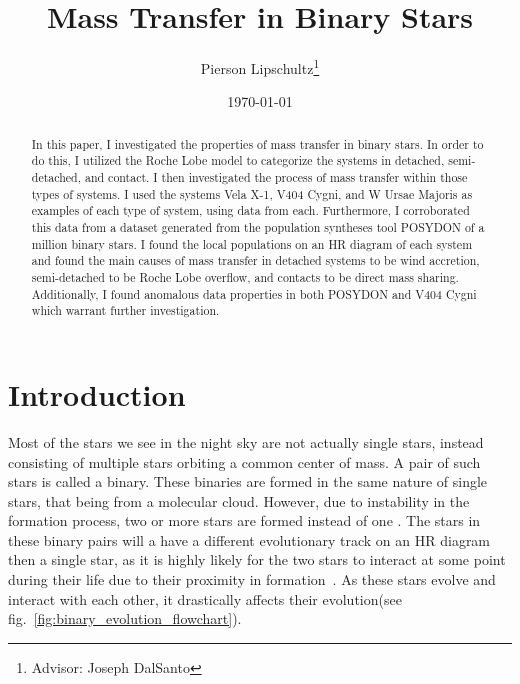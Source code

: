 \documentclass[12pt, a4paper]{article}
\title{Mass Transfer in Binary Stars}
\author{Pierson Lipschultz\thanks{Advisor: Joseph DalSanto}}
\date{\today}
\begin{document}
\maketitle
\begin{abstract}
    \normalsize
    In this paper, I investigated the properties of mass transfer in binary stars. In order to do this, I utilized the Roche Lobe model to categorize the systems in detached, semi-detached, and contact. I then investigated the process of mass transfer within those types of systems. I used the systems Vela X-1, V404 Cygni, and W Ursae Majoris as examples of each type of system, using data from each. Furthermore, I corroborated this data from a dataset generated from the population syntheses tool POSYDON of a million binary stars. I found the local populations on an HR diagram of each system and found the main causes of mass transfer in detached systems to be wind accretion, semi-detached to be Roche Lobe overflow, and contacts to be direct mass sharing. Additionally, I found anomalous data properties in both POSYDON and V404 Cygni which warrant further investigation.

\end{abstract}

\section{\centering Introduction} %

    Most of the stars we see in the night sky are not actually single stars, instead consisting of multiple stars orbiting a common center of mass. A pair of such stars is called a binary. These binaries are formed in the same nature of single stars, that being from a molecular cloud. However, due to instability in the formation process, two or more stars are formed instead of one \parencite{Offner_2016}. The stars in these binary pairs will a have a different evolutionary track on an HR diagram then a single star, as it is highly likely for the two stars to interact at some point during their life due to their proximity in formation~\parencite{TaurisvandenHeuvel+2023}. As these stars evolve and interact with each other, it drastically affects their evolution(see fig.~\ref{fig:binary_evolution_flowchart}).
\end{document}
